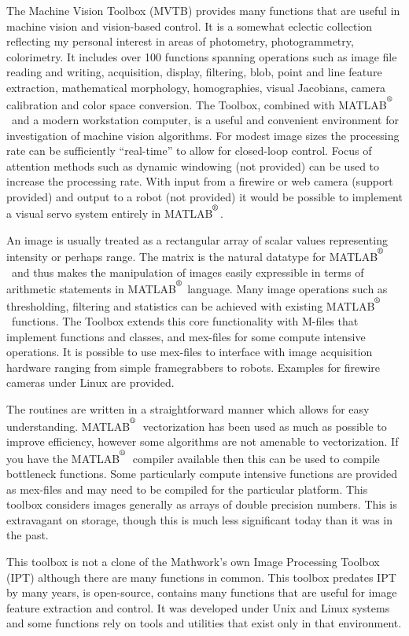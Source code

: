\documentclass[a4paper]{report}
\def\Mlab{MATLAB$^{\textsuperscript{\textregistered}}$}
\begin{document}
The Machine Vision Toolbox (MVTB) provides many 
functions that 
are useful in machine vision and vision-based control.
It is a somewhat eclectic collection reflecting my personal interest in
areas of photometry, photogrammetry, colorimetry.
It includes over 100 functions spanning operations such as
image file reading and writing, acquisition, display, filtering,
blob, point and line feature extraction,  mathematical morphology, 
homographies, visual Jacobians,
camera calibration and color space conversion.
The Toolbox, combined with \Mlab\ and a modern workstation computer,
is a useful and convenient environment for investigation of machine
vision algorithms.  For modest image sizes the processing rate can
be sufficiently ``real-time'' to allow for closed-loop control.  Focus of
attention methods such as dynamic windowing (not provided) can be
used to increase the processing rate.
With input from a firewire or web camera (support provided) and 
output to a robot
(not provided) it would be possible to implement a visual servo system
entirely in \Mlab.

An image is usually treated as a rectangular array of scalar values representing
intensity or perhaps range.
The matrix is the natural datatype for \Mlab\ and thus makes the manipulation
of images easily expressible in terms of arithmetic statements in \Mlab
language.
Many image operations such as thresholding, filtering and statistics can
be achieved with existing \Mlab\ functions.
The Toolbox extends this core functionality with M-files that
implement functions and classes, and mex-files for some compute
intensive operations.
It is possible to use mex-files to interface with image acquisition
hardware ranging from simple framegrabbers to robots.
Examples for firewire cameras under Linux are provided.

The routines are written in a straightforward manner which allows
for easy understanding.  \Mlab\ vectorization has been used as much as
possible to improve efficiency, however some algorithms are not amenable
to vectorization.
If you have the \Mlab\ compiler available then this can be used to compile
bottleneck functions.
Some particularly compute intensive functions are provided as mex-files and
may need to be compiled for the particular platform.
This toolbox considers images generally as arrays of double precision
numbers.  This is extravagant on storage, though this is much less
significant today than it was in the past.

This toolbox is not a clone of the Mathwork's own Image Processing 
Toolbox (IPT) although there are many functions in common.
This toolbox predates IPT by many years, is open-source, contains many 
functions that are useful for image feature extraction and control.
It was developed under Unix and Linux systems and some functions
rely on tools and utilities that exist only in that environment.
\end{document}
